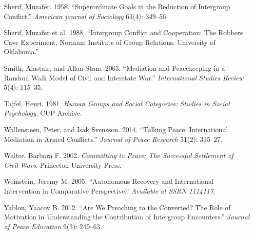 \documentclass[11pt]{article}
\begin{document}
\hypertarget{ref-sherif1958superordinate}{}
Sherif, Muzafer. 1958. ``Superordinate Goals in the Reduction of
Intergroup Conflict.'' \emph{American journal of Sociology} 63(4):
349--56.

\hypertarget{ref-Sherif1988robbersCave}{}
Sherif, Muzafer et al. 1988. ``Intergroup Conflict and Cooperation: The
Robbers Cave Experiment, Norman: Institute of Group Relations,
University of Oklahoma.''

\hypertarget{ref-smith2003mediation}{}
Smith, Alastair, and Allan Stam. 2003. ``Mediation and Peacekeeping in a
Random Walk Model of Civil and Interstate War.'' \emph{International
Studies Review} 5(4): 115--35.

\hypertarget{ref-tajfel1981groups}{}
Tajfel, Henri. 1981. \emph{Human Groups and Social Categories: Studies
in Social Psychology}. CUP Archive.

\hypertarget{ref-wallensteen2014talking}{}
Wallensteen, Peter, and Isak Svensson. 2014. ``Talking Peace:
International Mediation in Armed Conflicts.'' \emph{Journal of Peace
Research} 51(2): 315--27.

\hypertarget{ref-walter2002committing}{}
Walter, Barbara F. 2002. \emph{Committing to Peace: The Successful
Settlement of Civil Wars}. Princeton University Press.

\hypertarget{ref-weinstein2005autonomous}{}
Weinstein, Jeremy M. 2005. ``Autonomous Recovery and International
Intervention in Comparative Perspective.'' \emph{Available at SSRN
1114117}.

\hypertarget{ref-yablon2012we}{}
Yablon, Yaacov B. 2012. ``Are We Preaching to the Converted? The Role of
Motivation in Understanding the Contribution of Intergroup Encounters.''
\emph{Journal of Peace Education} 9(3): 249--63.
\end{document}
